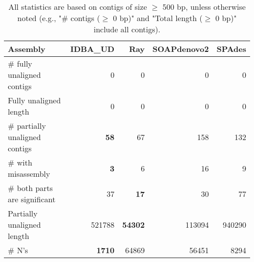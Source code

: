 \documentclass[12pt,a4paper]{article}
\begin{document}
\begin{table}[ht]
\begin{center}
\caption{All statistics are based on contigs of size $\geq$ 500 bp, unless otherwise noted (e.g., "\# contigs ($\geq$ 0 bp)" and "Total length ($\geq$ 0 bp)" include all contigs).}
\begin{tabular}{|l*{4}{|r}|}
\hline
Assembly & IDBA\_UD & Ray & SOAPdenovo2 & SPAdes \\ \hline
\# fully unaligned contigs & 0 & 0 & 0 & 0 \\ \hline
Fully unaligned length & 0 & 0 & 0 & 0 \\ \hline
\# partially unaligned contigs & {\bf 58} & 67 & 158 & 132 \\ \hline
\hspace{5mm}\# with misassembly & {\bf 3} & 6 & 16 & 9 \\ \hline
\hspace{5mm}\# both parts are significant & 37 & {\bf 17} & 30 & 77 \\ \hline
Partially unaligned length & 521788 & {\bf 54302} & 113094 & 940290 \\ \hline
\# N's & {\bf 1710} & 64869 & 56451 & 8294 \\ \hline
\end{tabular}
\end{center}
\end{table}
\end{document}
